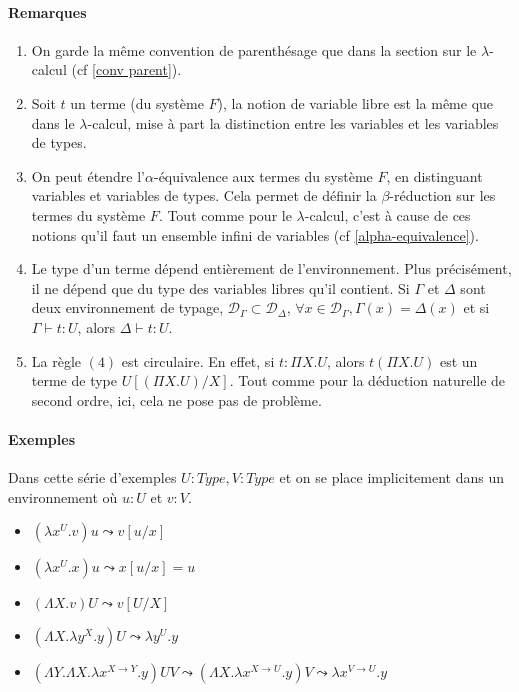 \documentclass[a4paper,12pt]{article}
\theoremstyle{plain}
\begin{document}
\paragraph{Remarques} 
\begin{enumerate}
\setlength\itemsep{ -1.5 em}
\item On garde la même convention de parenthésage que dans la section sur le $\lambda$-calcul (cf \ref{conv parent}).\\
\item Soit $t$ un terme (du système $F$), la notion de variable libre est la même que dans le $\lambda$-calcul, mise à part la distinction entre les variables et les variables de types.\\
\item On peut étendre l'$\alpha$-équivalence aux termes du système $F$, en distinguant variables et variables de types. Cela permet de définir la $\beta$-réduction sur les termes du système $F$. Tout comme pour le $\lambda$-calcul, c'est à cause de ces notions qu'il faut un ensemble infini de variables (cf \ref{alpha-equivalence}).\\
\item Le type d'un terme dépend entièrement de l'environnement. Plus précisément, il ne dépend que du type des variables libres qu'il contient. Si $\Gamma$ et $\Delta$ sont deux environnement de typage, $\mathcal{D}_\Gamma \subset  \mathcal{D}_\Delta$,  $\forall x \in \mathcal{D}_\Gamma, \Gamma(x) = \Delta(x)$ et si $\Gamma \vdash t : U$, alors $\Delta \vdash t : U$.\\
\item  La règle $(4)$ est circulaire. En effet, si $t : \Pi X.U$, alors $t ( \Pi X.U)$ est un terme de type $U[(\Pi X.U) /X]$. Tout comme pour la déduction naturelle de second ordre, ici, cela ne pose pas de problème. 
\end{enumerate}

\paragraph{Exemples}

Dans cette série d'exemples $U: \mathit{Type}, V : \mathit{Type}$ et on se place implicitement dans un environnement où $u : U$ et $v: V$.

\begin{itemize}
\setlength\itemsep{ -1.5 em}
\item $ (\lambda x^U. v) u \leadsto  v[u/x]$\\
\item $(\lambda x^U. x) u \leadsto x[u/x] = u$\\
\item $(\Lambda X. v) U \leadsto v[U/X]$\\
\item $(\Lambda X. \lambda y^X. y) U \leadsto  \lambda y^U. y$\\
\item $(\Lambda Y. \Lambda X. \lambda x^{X \to Y}. y) U V \leadsto ( \Lambda X. \lambda x^{X \to U}. y) V \leadsto   \lambda x^{V \to U}. y$
\end{itemize}
\end{document}
